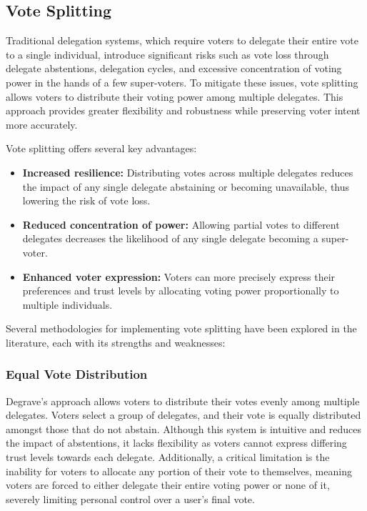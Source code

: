\subsection*{Vote Splitting}\label{subsec:vote_splitting_background}

Traditional delegation systems, which require voters to delegate their entire vote to a single individual, introduce significant risks such as vote loss through delegate abstentions, delegation cycles, and excessive concentration of voting power in the hands of a few super-voters. To mitigate these issues, vote splitting allows voters to distribute their voting power among multiple delegates. This approach provides greater flexibility and robustness while preserving voter intent more accurately.

Vote splitting offers several key advantages:
\begin{itemize}
  \item \textbf{Increased resilience:} Distributing votes across multiple delegates reduces the impact of any single delegate abstaining or becoming unavailable, thus lowering the risk of vote loss.
  \item \textbf{Reduced concentration of power:} Allowing partial votes to different delegates decreases the likelihood of any single delegate becoming a super-voter.
  \item \textbf{Enhanced voter expression:} Voters can more precisely express their preferences and trust levels by allocating voting power proportionally to multiple individuals.
\end{itemize}

Several methodologies for implementing vote splitting have been explored in the literature, each with its strengths and weaknesses:

\subsubsection*{Equal Vote Distribution~\citep{degrave2014}}
Degrave's approach allows voters to distribute their votes evenly among multiple delegates. Voters select a group of delegates, and their vote is equally distributed amongst those that do not abstain.
Although this system is intuitive and reduces the impact of abstentions, it lacks flexibility as voters cannot express differing trust levels towards each delegate. Additionally, a critical limitation is the inability for voters to allocate any portion of their vote to themselves, meaning voters are forced to either delegate their entire voting power or none of it, severely limiting personal control over a user's final vote.

